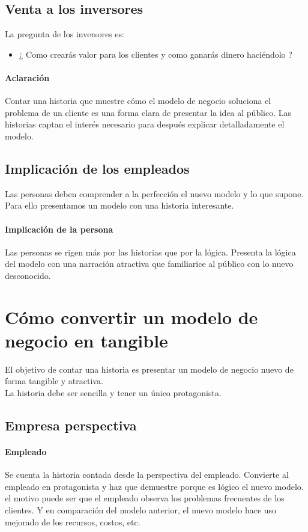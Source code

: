 \documentclass[11pt]{book}
\begin{document}
\subsection{Venta a los inversores}
La pregunta de los inversores es:
\begin{itemize}
\item ¿ Como crearás valor para los clientes y como ganarás dinero haciéndolo ?
\end{itemize}
\paragraph{Aclaración}
Contar una historia que muestre cómo el modelo de negocio soluciona el problema de un cliente es una forma clara de presentar la idea al público. Las historias captan el interés necesario para después explicar detalladamente el modelo.
\subsection{Implicación de los empleados}
Las personas deben comprender a la perfección el nuevo modelo y lo que supone. Para ello presentamos un modelo con una historia interesante.
\paragraph{Implicación de la persona}
Las personas se rigen más por las historias que por la lógica. Presenta la lógica del modelo con una narración atractiva que familiarice al público con lo nuevo desconocido.
\section{Cómo convertir un modelo de negocio en tangible}
El objetivo de contar una historia es presentar un modelo de negocio nuevo de forma tangible y atractiva.\\
La historia debe ser sencilla y tener un único protagonista.
\subsection{Empresa perspectiva}
\paragraph{Empleado} Se cuenta la historia contada desde la perspectiva del empleado. Convierte al empleado en protagonista y haz que demuestre porque es lógico el nuevo modelo. el motivo puede ser que el empleado observa los problemas frecuentes de los clientes. Y en comparación del modelo anterior, el nuevo modelo hace uso mejorado de los recursos, costos, etc.
\end{document}
